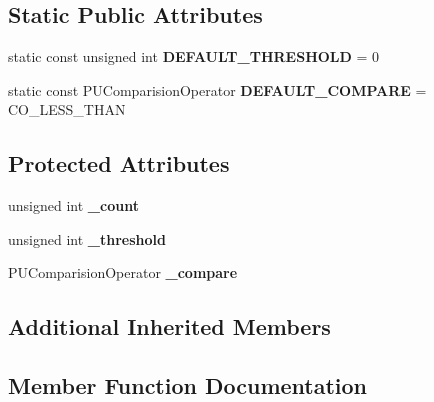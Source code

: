 \subsection*{Static Public Attributes}
\begin{DoxyCompactItemize}
\item 
\mbox{\label{classPUOnCountObserver_a329fc2412c790fecdcd964fc008e7b81}} 
static const unsigned int {\bfseries D\+E\+F\+A\+U\+L\+T\+\_\+\+T\+H\+R\+E\+S\+H\+O\+LD} = 0
\item 
\mbox{\label{classPUOnCountObserver_a599a924d46210f8636873e8968949a37}} 
static const P\+U\+Comparision\+Operator {\bfseries D\+E\+F\+A\+U\+L\+T\+\_\+\+C\+O\+M\+P\+A\+RE} = C\+O\+\_\+\+L\+E\+S\+S\+\_\+\+T\+H\+AN
\end{DoxyCompactItemize}
\subsection*{Protected Attributes}
\begin{DoxyCompactItemize}
\item 
\mbox{\label{classPUOnCountObserver_a548f784eb4b9576f2d32b422ac02460c}} 
unsigned int {\bfseries \+\_\+count}
\item 
\mbox{\label{classPUOnCountObserver_a934fa32a18215a9124df31aa5eed8a24}} 
unsigned int {\bfseries \+\_\+threshold}
\item 
\mbox{\label{classPUOnCountObserver_ab388137f10e54d5608b550d769391df0}} 
P\+U\+Comparision\+Operator {\bfseries \+\_\+compare}
\end{DoxyCompactItemize}
\subsection*{Additional Inherited Members}


\subsection{Member Function Documentation}
\mbox{\label{classPUOnCountObserver_a8f6c4a64fa9fc49264a5cb3430d04c27}} 
